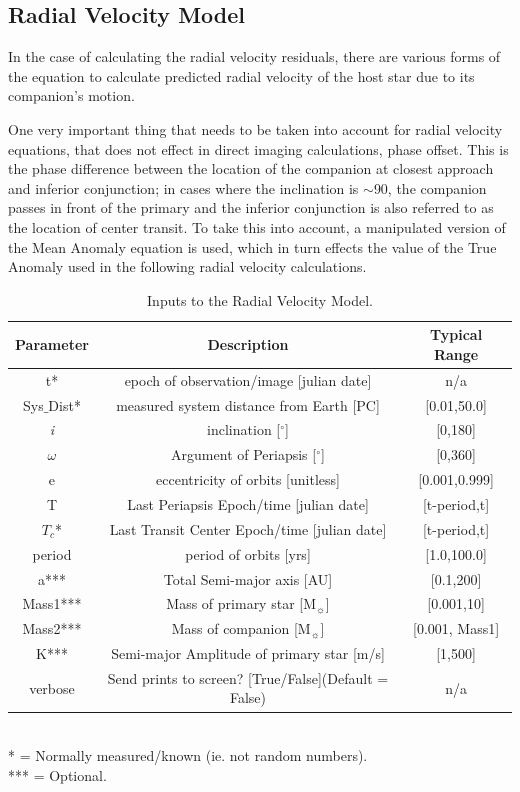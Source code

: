 \documentclass[12pt,preprint]{aastex}
\begin{document}
\subsection{Radial Velocity Model}\label{sec:RV-OrbModels}

In the case of calculating the radial velocity residuals, there are various forms of the equation to calculate predicted radial velocity of the host star due to its companion's motion.

One very important thing that needs to be taken into account for radial velocity equations, that does not effect in direct imaging calculations, phase offset.  This is the phase difference between the location of the companion at closest approach and inferior conjunction; in cases where the inclination is $\sim$90, the companion passes in front of the primary and the inferior conjunction is also referred to as the location of center transit.  To take this into account, a manipulated version of the Mean Anomaly equation is used, which in turn effects the value of the True Anomaly used in the following radial velocity calculations.
\begin{table}[h]
\centering
\caption{ Inputs to the Radial Velocity Model.}
\begin{tabular}{c c c}
\hline\hline
Parameter & Description & Typical Range \\
\hline
t* & epoch of observation/image [julian date] & n/a\\
Sys$\_$Dist* & measured system distance from Earth [PC] &  [0.01,50.0]\\
{\it i} & inclination [$^{\circ}$] & [0,180]\\
$\omega$ & Argument of Periapsis [$^{\circ}$] & [0,360]\\
e & eccentricity of orbits [unitless] & [0.001,0.999]\\
T & Last Periapsis Epoch/time [julian date] & [t-period,t]\\
$T_c$* & Last Transit Center Epoch/time [julian date] & [t-period,t]\\
period & period of orbits [yrs] & [1.0,100.0]\\
a*** & Total Semi-major axis [AU]  & [0.1,200] \\
Mass1*** & Mass of primary star [M$_{\sun}$] & [0.001,10] \\
Mass2*** & Mass of companion [M$_{\sun}$] & [0.001, Mass1] \\
K*** & Semi-major Amplitude of primary star [m/s]& [1,500]\\
verbose & Send prints to screen? [True/False](Default = False) & n/a\\
\hline
\end{tabular}
\\
  * = Normally measured/known (ie. not random numbers).\\
 *** = Optional.
\end{table}
\end{document}
